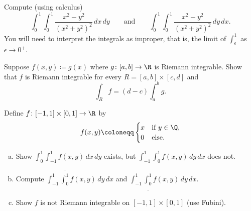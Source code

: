 \begin{exercise}
Compute (using calculus)
\begin{equation*}
\int_0^1 \int_0^1 \frac{x^2-y^2}{{(x^2+y^2)}^2} \, dx \, dy
\qquad \text{and} \qquad
\int_0^1 \int_0^1 \frac{x^2-y^2}{{(x^2+y^2)}^2} \, dy \, dx .
\end{equation*}
You will need to interpret the integrals as improper, that
is, the limit of $\int_\epsilon^1$ as $\epsilon \to 0^+$.
\end{exercise}

\begin{exercise}
Suppose $f(x,y) \coloneqq g(x)$ where $g \colon [a,b] \to \R$ is Riemann integrable.
Show that $f$ is Riemann integrable for every $R = [a,b] \times [c,d]$ and 
\begin{equation*}
\int_R f = (d-c) \int_a^b g .
\end{equation*}
\end{exercise}

\begin{exercise}
Define $f \colon [-1,1] \times [0,1] \to \R$ by
\begin{equation*}
f(x,y) \coloneqq
\begin{cases}
x & \text{if } y \in \Q, \\
0 & \text{else.} 
\end{cases}
\end{equation*}
\begin{enumerate}[a)]
\item
Show
$\int_0^1 \int_{-1}^1 f(x,y) \, dx \, dy$ exists, but
$\int_{-1}^1 \int_0^1 f(x,y) \, dy \, dx$ does not.
\item
Compute
$\int_{-1}^1 \overline{\int_0^1} f(x,y) \, dy \, dx$ and
$\int_{-1}^1 \underline{\int_0^1} f(x,y) \, dy \, dx$.
\item
Show $f$ is not Riemann integrable on $[-1,1] \times [0,1]$ (use
Fubini).
\end{enumerate}
\end{exercise}

